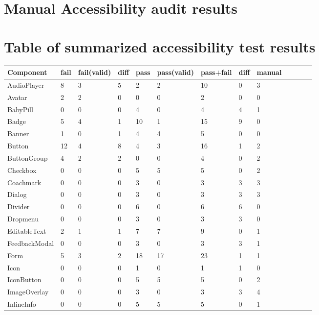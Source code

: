 \documentclass{master_thesis}
\begin{document}
\section{Manual Accessibility audit results}\label{appendix:manual-audit}

\section{Table of summarized accessibility test results}\label{appendix:results-table}


\begin{table}[!ht]
    \centering
    \begin{tabular}{|l|l|l|l|l|l|l|l|l|l|l|l|l|}
    \hline
        Component & fail & fail(valid) & diff & pass & pass(valid) & pass+fail & diff & manual  \\ \hline
        AudioPlayer & 8 & 3 & 5 & 2 & 2 & 10 & 0 & 3  \\ \hline
        Avatar & 2 & 2 & 0 & 0 & 0 & 2 & 0 & 0  \\ \hline
        BabyPill & 0 & 0 & 0 & 4 & 0 & 4 & 4 & 1  \\ \hline
        Badge & 5 & 4 & 1 & 10 & 1 & 15 & 9 & 0  \\ \hline
        Banner & 1 & 0 & 1 & 4 & 4 & 5 & 0 & 0  \\ \hline
        Button & 12 & 4 & 8 & 4 & 3 & 16 & 1 & 2  \\ \hline
        ButtonGroup & 4 & 2 & 2 & 0 & 0 & 4 & 0 & 2  \\ \hline
        Checkbox & 0 & 0 & 0 & 5 & 5 & 5 & 0 & 2  \\ \hline
        Coachmark & 0 & 0 & 0 & 3 & 0 & 3 & 3 & 3  \\ \hline
        Dialog & 0 & 0 & 0 & 3 & 0 & 3 & 3 & 3  \\ \hline
        Divider & 0 & 0 & 0 & 6 & 0 & 6 & 6 & 0  \\ \hline
        Dropmenu & 0 & 0 & 0 & 3 & 0 & 3 & 3 & 0  \\ \hline
        EditableText & 2 & 1 & 1 & 7 & 7 & 9 & 0 & 1  \\ \hline
        FeedbackModal & 0 & 0 & 0 & 3 & 0 & 3 & 3 & 1  \\ \hline
        Form & 5 & 3 & 2 & 18 & 17 & 23 & 1 & 1  \\ \hline
        Icon & 0 & 0 & 0 & 1 & 0 & 1 & 1 & 0  \\ \hline
        IconButton & 0 & 0 & 0 & 5 & 5 & 5 & 0 & 2  \\ \hline
        ImageOverlay & 0 & 0 & 0 & 3 & 0 & 3 & 3 & 4  \\ \hline
        InlineInfo & 0 & 0 & 0 & 5 & 5 & 5 & 0 & 1  \\ \hline
    \end{tabular}
\end{table}
\end{document}
